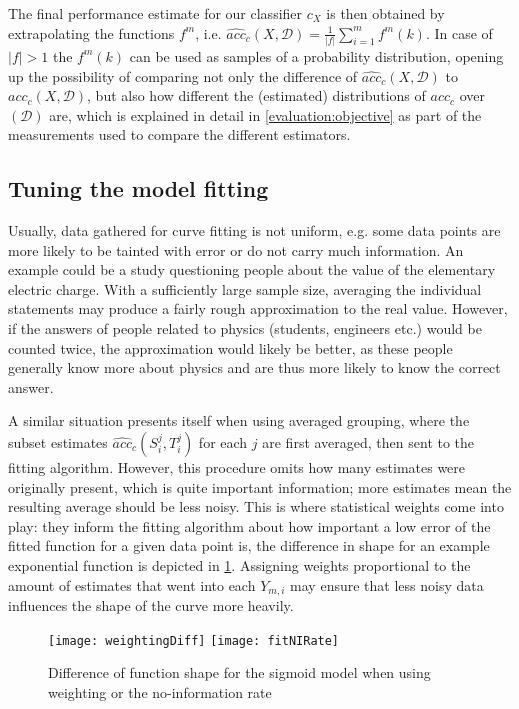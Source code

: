 The final performance estimate for our classifier $c_X$ is then obtained by extrapolating the functions $f^m$, i.e. $\widehat{acc}_c(X, \mathcal{D}) = \frac{1}{|f|} \sum_{i=1}^{m} f^m(k)$. In case of $|f| > 1$ the $f^m(k)$ can be used as samples of a probability distribution, opening up the possibility of comparing not only the difference of $\widehat{acc}_c(X, \mathcal{D})$ to $acc_c(X, \mathcal{D})$, but also how different the (estimated) distributions of $acc_c$ over $\mathcal{(D)}$ are, which is explained in detail in \ref{evaluation:objective} as part of the measurements used to compare the different estimators.

\subsection{Tuning the model fitting}
Usually, data gathered for curve fitting is not uniform, e.g. some data points are more likely to be tainted with error or do not carry much information. An example could be a study questioning people about the value of the elementary electric charge. With a sufficiently large sample size, averaging the individual statements may produce a fairly rough approximation to the real value. However, if the answers of people related to physics (students, engineers etc.) would be counted twice, the approximation would likely be better, as these people generally know more about physics and are thus more likely to know the correct answer.

A similar situation presents itself when using averaged grouping, where the subset estimates $\widehat{acc}_c(S^j_i, T^j_i)$ for each $j$ are first averaged, then sent to the fitting algorithm. However, this procedure omits how many estimates were originally present, which is quite important information; more estimates mean the resulting average should be less noisy. This is where statistical weights come into play: they inform the fitting algorithm about how important a low error of the fitted function for a given data point is, the difference in shape for an example exponential function is depicted in \ref{fig:weigthingExample}. Assigning weights proportional to the amount of estimates that went into each $Y_{m,i}$ may ensure that less noisy data influences the shape of the curve more heavily.

\begin{figure}[h]
	\centering
	\texttt{[image: weightingDiff]}
	\texttt{[image: fitNIRate]}
	\caption{Difference of function shape for the sigmoid model when using weighting or the no-information rate}
	\label{fig:weigthingExample}
\end{figure}

